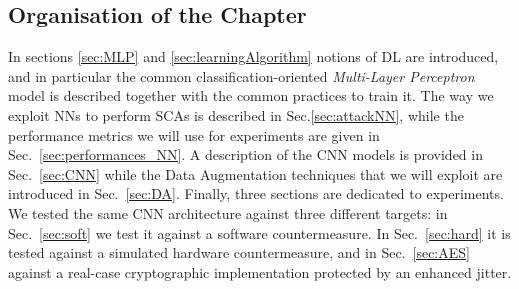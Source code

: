 \subsection*{Organisation of the Chapter}
In sections \ref{sec:MLP} and \ref{sec:learningAlgorithm} notions of DL are introduced, and in particular the common classification-oriented \emph{Multi-Layer Perceptron} model is described together with the common practices to train it. The way we exploit NNs to perform SCAs is described in Sec.\ref{sec:attackNN}, while the performance metrics we will use for experiments are given in Sec.~\ref{sec:performances_NN}. A description of the CNN models is provided in Sec.~\ref{sec:CNN} while the Data Augmentation techniques that we will exploit are introduced in Sec.~\ref{sec:DA}.  Finally, three sections are dedicated to experiments. We tested the same CNN architecture against three different targets: in Sec.~\ref{sec:soft} we test it against a software countermeasure. In Sec.~\ref{sec:hard} it is tested against a simulated hardware countermeasure, and in Sec.~\ref{sec:AES} against a real-case cryptographic implementation protected by an enhanced jitter. 






